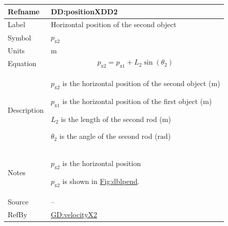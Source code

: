 \documentclass[12pt]{article}
\begin{document}
\begin{minipage}{\textwidth}
\begin{tabular}{>{\raggedright}p{}>{\raggedright\arraybackslash}p{}}
\toprule \textbf{Refname} & \textbf{DD:positionXDD2}
\label{DD:positionXDD2}
\\ \midrule
Label & Horizontal position of the second object
        
\\ \midrule
Symbol & ${p_{\text{x}2}}$
         
\\ \midrule
Units & ${\text{m}}$
        
\\ \midrule
Equation & \begin{displaymath}
           {p_{\text{x}2}}={p_{\text{x}1}}+{L_{2}} \sin\left({θ_{2}}\right)
           \end{displaymath}
\\ \midrule
Description & \begin{symbDescription}
              \item{${p_{\text{x}2}}$ is the horizontal position of the second object (${\text{m}}$)}
              \item{${p_{\text{x}1}}$ is the horizontal position of the first object (${\text{m}}$)}
              \item{${L_{2}}$ is the length of the second rod (${\text{m}}$)}
              \item{${θ_{2}}$ is the angle of the second rod (${\text{rad}}$)}
              \end{symbDescription}
\\ \midrule
Notes & ${p_{\text{x}2}}$ is the horizontal position
        
        ${p_{\text{x}2}}$ is shown in \hyperref[Figure:dblpend]{Fig:dblpend}.
        
\\ \midrule
Source & --
         
\\ \midrule
RefBy & \hyperref[GD:velocityX2]{GD:velocityX2}
        
\\ \bottomrule
\end{tabular}
\end{minipage}
\vspace{\baselineskip}
\noindent
\end{document}
